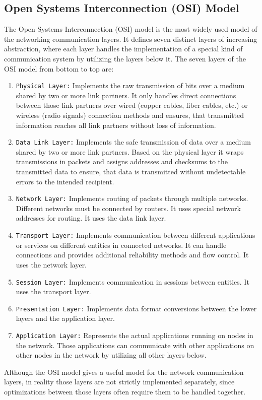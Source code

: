 \subsection{Open Systems Interconnection (OSI) Model}
The Open Systems Interconnection (OSI) model is the most widely used model of the networking communication layers. It defines seven distinct layers of increasing abstraction, where each layer handles the implementation of a special kind of communication system by utilizing the layers below it. The seven layers of the OSI model from bottom to top are:
\begin{enumerate}
  \item \texttt{Physical Layer:} Implements the raw transmission of bits over a medium shared by two or more link partners. It only handles direct connections between those link partners over wired (copper cables, fiber cables, etc.) or wireless (radio signals) connection methods and ensures, that transmitted information reaches all link partners without loss of information.
  \item \texttt{Data Link Layer:} Implements the safe transmission of data over a medium shared by two or more link partners. Based on the physical layer it wraps transmissions in packets and assigns addresses and checksums to the transmitted data to ensure, that data is transmitted without undetectable errors to the intended recipient.
  \item \texttt{Network Layer:} Implements routing of packets through multiple networks. Different networks must be connected by routers. It uses special network addresses for routing. It uses the data link layer.
  \item \texttt{Transport Layer:} Implements communication between different applications or services on different entities in connected networks. It can handle connections and provides additional reliability methods and flow control. It uses the network layer.
  \item \texttt{Session Layer:} Implements communication in sessions between entities. It uses the transport layer.
  \item \texttt{Presentation Layer:} Implements data format conversions between the lower layers and the application layer.
  \item \texttt{Application Layer:} Represents the actual applications running on nodes in the network. Those applications can communicate with other applications on other nodes in the network by utilizing all other layers below.
\end{enumerate}
Although the OSI model gives a useful model for the network communication layers, in reality those layers are not strictly implemented separately, since optimizations between those layers often require them to be handled together.

